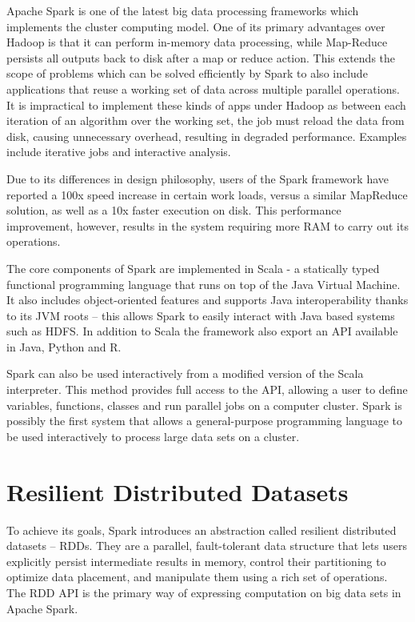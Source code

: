 \documentclass{l4proj}
\begin{document}
Apache Spark is one of the latest big data processing frameworks which implements the cluster computing model. One of its primary advantages over Hadoop is that it can perform in-memory data processing, while Map-Reduce persists all outputs back to disk after a map or reduce action. This extends the scope of problems which can be solved efficiently by Spark to also include applications that reuse a working set of data across multiple parallel operations. It is impractical to implement these kinds of apps under Hadoop as between each iteration of an algorithm over the working set, the job must reload the data from disk, causing unnecessary overhead, resulting in degraded performance. Examples include iterative jobs and interactive analysis\cite{Spark}.

Due to its differences in design philosophy, users of the Spark framework have reported a 100x speed increase in certain work loads, versus a similar MapReduce solution, as well as a 10x faster execution on disk\cite{webSpark}. This performance improvement, however, results in the system requiring more RAM to carry out its operations.

The core components of Spark are implemented in Scala - a statically typed functional programming language that runs on top of the Java Virtual Machine. It also includes object-oriented features and supports Java interoperability thanks to its JVM roots -- this allows Spark to easily interact with Java based systems such as HDFS. In addition to Scala the framework also export an API available in Java, Python and R.

Spark can also be used interactively from a modified version of the Scala interpreter. This method provides full access to the API, allowing a user to define variables, functions, classes and run parallel jobs on a computer cluster. Spark is possibly the first system that allows a general-purpose programming language to be used interactively to process large data sets on a cluster\cite{Spark}.

\section{Resilient Distributed Datasets}

To achieve its goals, Spark introduces an abstraction called resilient distributed datasets -- RDDs. They are a parallel, fault-tolerant data structure that lets users explicitly persist intermediate results in memory, control their partitioning to optimize data placement, and manipulate them using a rich set of operations\cite{RDD}. The RDD API is the primary way of expressing computation on big data sets in Apache Spark.
\end{document}
